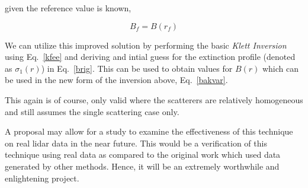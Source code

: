\noindent
given the reference value is known,

\begin{equation}
{B_{f}}=B(r_f)
\label{Bref}
\end{equation}

\noindent
We can utilize this improved solution by performing 
the basic {\em Klett Inversion} using Eq.~{\ref{kfee}}
and deriving and intial guess for the extinction
profile (denoted as ${{\sigma_1}(r)}$) in Eq.~{\ref{brig}}. 
This can be used to obtain values for $B(r)$  which can be used in the
new form of the inversion above, Eq.~{\ref{bakvar}}. 

This again is of course, only valid where the scatterers are
relatively homogeneous and still assumes the single scattering case only.

A proposal may allow for a study to examine the effectiveness
of this technique on real lidar data in the near future. This
would be a verification of this technique
using real data as compared to the original work which used data generated 
by other methods. Hence, it will be an extremely worthwhile
and enlightening project.
